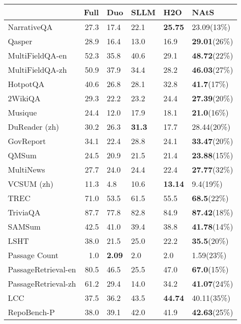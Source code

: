 \begin{tabular}{l|r|llll}
\toprule
 & Full & Duo & SLLM & H2O & NAtS \\
\midrule
NarrativeQA & 27.3 & 17.4 & 22.1 & \textbf {25.75} & 23.09(13\%) \\
Qasper & 28.9 & 16.4 & 13.0 & 16.9 & \textbf {29.01}(26\%) \\
MultiFieldQA-en & 52.3 & 35.8 & 40.6 & 29.1 & \textbf {48.72}(22\%) \\
MultiFieldQA-zh & 50.9 & 37.9 & 34.4 & 28.2 & \textbf {46.03}(27\%) \\
HotpotQA & 40.6 & 26.8 & 28.1 & 32.8 & \textbf {41.7}(17\%) \\
2WikiQA & 29.3 & 22.2 & 23.2 & 24.4 & \textbf {27.39}(20\%) \\
Musique & 24.4 & 12.0 & 17.9 & 18.1 & \textbf {21.0}(16\%) \\
DuReader (zh) & 30.2 & 26.3 & \textbf {31.3} & 17.7 & 28.44(20\%) \\
GovReport & 34.1 & 22.4 & 28.8 & 24.1 & \textbf {33.47}(20\%) \\
QMSum & 24.5 & 20.9 & 21.5 & 21.4 & \textbf {23.88}(15\%) \\
MultiNews & 27.7 & 24.0 & 24.4 & 22.4 & \textbf {27.77}(32\%) \\
VCSUM (zh) & 11.3 & 4.8 & 10.6 & \textbf {13.14} & 9.4(19\%) \\
TREC & 71.0 & 53.5 & 61.5 & 55.5 & \textbf {68.5}(22\%) \\
TriviaQA & 87.7 & 77.8 & 82.8 & 84.9 & \textbf {87.42}(18\%) \\
SAMSum & 42.5 & 41.0 & 39.4 & 38.8 & \textbf {41.78}(14\%) \\
LSHT & 38.0 & 21.5 & 25.0 & 22.2 & \textbf {35.5}(20\%) \\
Passage Count & 1.0 & \textbf {2.09} & 2.0 & 2.0 & 1.59(23\%) \\
PassageRetrieval-en & 80.5 & 46.5 & 25.5 & 47.0 & \textbf {67.0}(15\%) \\
PassageRetrieval-zh & 61.2 & 29.4 & 14.0 & 34.2 & \textbf {41.07}(24\%) \\
LCC & 37.5 & 36.2 & 43.5 & \textbf {44.74} & 40.11(35\%) \\
RepoBench-P & 38.0 & 39.1 & 42.0 & 41.9 & \textbf {42.63}(25\%) \\
\bottomrule
\end{tabular}
